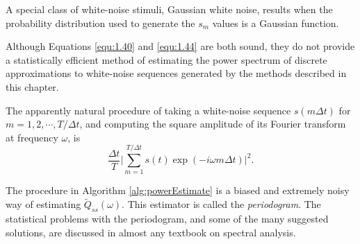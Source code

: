 \begin{exm}
  \label{exm:whiteNoiseApproxExm}
  A special class of white-noise stimuli, Gaussian white noise, results when the probability distribution used to generate the $s_m$ values is a Gaussian function.
\end{exm}


\begin{rem}
  Although Equations \ref{equ:1.40} and \ref{equ:1.44} are both sound, they do not provide a statistically efficient method of estimating the power spectrum of discrete approximations to white-noise sequences generated by the methods described in this chapter.
\end{rem}

\begin{alg}
  \label{alg:powerEstimate}
   The apparently natural procedure of taking a white-noise sequence $s(m\Delta{t})$ for $m=1,2,\cdots, T/\Delta{t}$, and computing the square amplitude of its Fourier transform at frequency $\omega$, is
   \begin{displaymath}
    \frac{\Delta{t}}{T} \Bigg |\sum_{m=1}^{T/\Delta{t}}s(t)\exp(-i\omega m\Delta{t}) \Bigg |^2.
  \end{displaymath}
\end{alg}

\begin{rem}
  The procedure in Algorithm \ref{alg:powerEstimate} is a biased and extremely noisy way of estimating $\widetilde{Q}_{ss}(\omega)$. This estimator is called the \emph{periodogram}. The statistical problems with the periodogram, and some of the many suggested solutions, are discussed in almost any textbook on spectral analysis.
\end{rem}

